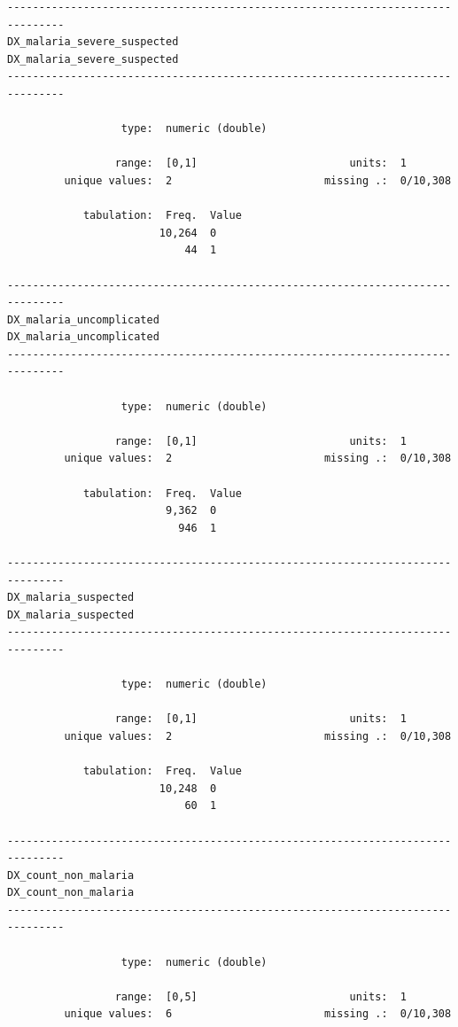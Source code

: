 \documentclass[
  letterpaper,
  DIV=11,
  numbers=noendperiod]{scrreprt}
\begin{document}
\begin{verbatim}
-------------------------------------------------------------------------------
DX_malaria_severe_suspected                         DX_malaria_severe_suspected
-------------------------------------------------------------------------------

                  type:  numeric (double)

                 range:  [0,1]                        units:  1
         unique values:  2                        missing .:  0/10,308

            tabulation:  Freq.  Value
                        10,264  0
                            44  1

-------------------------------------------------------------------------------
DX_malaria_uncomplicated                               DX_malaria_uncomplicated
-------------------------------------------------------------------------------

                  type:  numeric (double)

                 range:  [0,1]                        units:  1
         unique values:  2                        missing .:  0/10,308

            tabulation:  Freq.  Value
                         9,362  0
                           946  1

-------------------------------------------------------------------------------
DX_malaria_suspected                                       DX_malaria_suspected
-------------------------------------------------------------------------------

                  type:  numeric (double)

                 range:  [0,1]                        units:  1
         unique values:  2                        missing .:  0/10,308

            tabulation:  Freq.  Value
                        10,248  0
                            60  1

-------------------------------------------------------------------------------
DX_count_non_malaria                                       DX_count_non_malaria
-------------------------------------------------------------------------------

                  type:  numeric (double)

                 range:  [0,5]                        units:  1
         unique values:  6                        missing .:  0/10,308


\end{verbatim}
\end{document}
